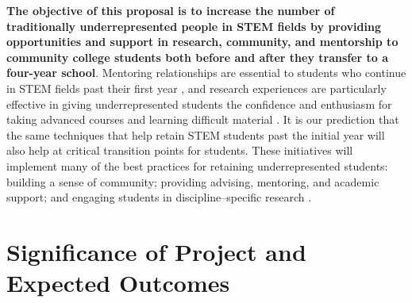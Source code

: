 \documentclass[12pt]{article}
\begin{document}

	
{\bf The objective of this proposal is to increase the number of traditionally underrepresented people in STEM fields by providing opportunities and support in research, community, and mentorship to community college students both before and after they transfer to a four-year school}. Mentoring relationships are essential to students who continue in STEM fields past their first year \citep{reureport,Nagda,Wilson}, and research experiences are particularly effective in giving underrepresented students the confidence and enthusiasm for taking advanced courses and learning difficult material \citep{armstrong03}. It is our prediction that the same techniques that help retain STEM students past the initial year will also help at critical transition points for students. These initiatives will implement many of the best practices for retaining underrepresented students:  building a sense of community; providing advising, mentoring, and academic support; and engaging students in discipline--specific research \citep{jordan,holland}. 	
\vspace{-5mm}

\section{Significance of Project and Expected Outcomes}
\vspace{-3mm}
\end{document}
